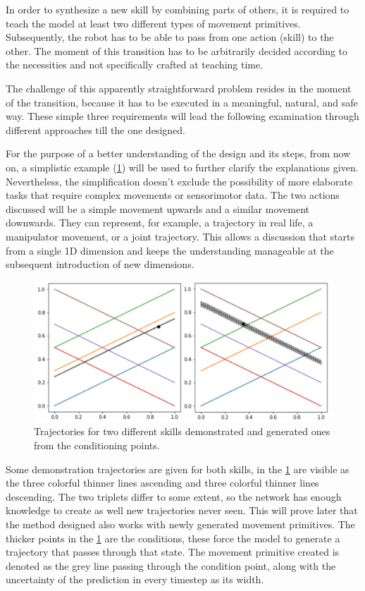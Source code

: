 In order to synthesize a new skill by combining parts of others, it is required to teach the model at least two different types of movement primitives. Subsequently, the robot has to be able to pass from one action (skill) to the other. The moment of this transition has to be arbitrarily decided according to the necessities and not specifically crafted at teaching time. 

The challenge of this apparently straightforward problem resides in the moment of the transition, because it has to be executed in a meaningful, natural, and safe way. These simple three requirements will lead the following examination through different approaches till the one designed. 

For the purpose of a better understanding of the design and its steps, from now on, a simplistic example (\cref{fig:trajX}) will be used to further clarify the explanations given. Nevertheless, the simplification doesn't exclude the possibility of more elaborate tasks that require complex movements or sensorimotor data. The two actions discussed will be a simple movement upwards and a similar movement downwards. They can represent, for example, a trajectory in real life, a manipulator movement, or a joint trajectory. This allows a discussion that starts from a single 1D dimension and keeps the understanding manageable at the subsequent introduction of new dimensions. 

\begin{figure}
    \centering
    \includegraphics[width=0.8\linewidth]{figures/trajX.png}
    \caption{Trajectories for two different skills demonstrated and generated ones from the conditioning points.}
    \label{fig:trajX}
\end{figure}

Some demonstration trajectories are given for both skills, in the \cref{fig:trajX} are visible as the three colorful thinner lines ascending and three colorful thinner lines descending. The two triplets differ to some extent, so the network has enough knowledge to create as well new trajectories never seen. This will prove later that the method designed also works with newly generated movement primitives. 
The thicker points in the \cref{fig:trajX} are the conditions, these force the model to generate a trajectory that passes through that state. The movement primitive created is denoted as the grey line passing through the condition point, along with the uncertainty of the prediction in every timestep as its width. 

